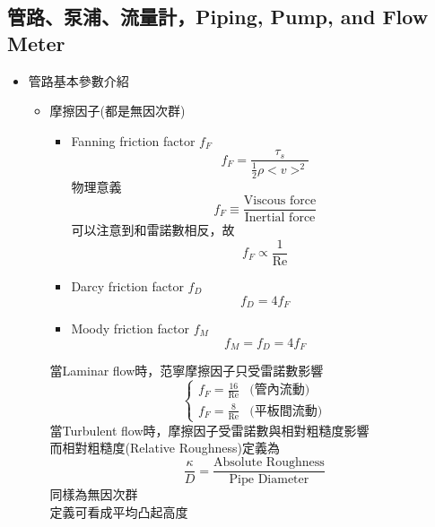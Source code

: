 \documentclass[../main.tex]{subfiles}
\begin{document}
\subsection{管路、泵浦、流量計，Piping, Pump, and Flow Meter}
\begin{itemize}
  \item 管路基本參數介紹
  \begin{itemize}
    \item 摩擦因子(都是無因次群)
    \begin{itemize}
      \item Fanning friction factor $f_F$
      \begin{equation}
        f_F = \frac{\tau_s}{\frac{1}{2}\rho <v>^2}
      \end{equation}
      物理意義
      \begin{equation}
        f_F \equiv \frac{\text{Viscous force}}{\text{Inertial force}}
      \end{equation}
      可以注意到和雷諾數相反，故
      \begin{equation}
        f_F \propto \frac{1}{\text{Re}}
      \end{equation}
      \item Darcy friction factor $f_D$
      \begin{equation}
        f_D = 4f_F
      \end{equation}
      \item Moody friction factor $f_M$
      \begin{equation}
        f_M = f_D = 4f_F
      \end{equation}
    \end{itemize}
    當Laminar flow時，范寧摩擦因子只受雷諾數影響
    \begin{equation}
      \begin{cases}
        f_F = \frac{16}{\text{Re}} & \text{(管內流動)} \\
        f_F = \frac{8}{\text{Re}} & \text{(平板間流動)}
      \end{cases}
    \end{equation}
    當Turbulent flow時，摩擦因子受雷諾數與相對粗糙度影響\\
    而相對粗糙度(Relative Roughness)定義為
    \begin{equation}
      \frac{\kappa}{D} = \frac{\text{Absolute Roughness}}{\text{Pipe Diameter}}
    \end{equation}
    同樣為無因次群\\
    定義可看成平均凸起高度\\

\end{itemize}
\end{itemize}
\end{document}
